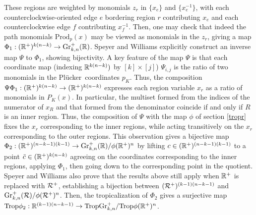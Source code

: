 \documentclass[12pt,letter]{article}
\newcommand{\gr}{\mathrm{Gr}}
\newcommand{\trop}{\mathrm{Trop}}
\newcommand{\prad}{\mathrm{Prod}}
\newcommand{\plu}{Pl\"ucker~}
\begin{document}
  These regions are weighted by monomials $z_r$ in $\{x_e\}$ and $\{x_e^{-1}\}$, with each counterclockwise-oriented edge $e$ bordering region $r$ contributing $x_e$ and each counterclockwise edge $f$ contributing $x_f^{-1}$. Then, one may check that indeed the path monomials $\prad_p(x)$ may be viewed as monomials in the $z_r$, giving a map $\Phi_1:(\RR^+)^{k(n-k)}\to \gr_{k,n}^+(\RR)$.
  Speyer and Williams explicitly construct an inverse map $\Psi$ to $\Phi_1$, showing bijectivity. 
  A key feature of the map $\Psi$ is that each coordinate map (indexing ${\mathbb R}^{k(n-k)})$ by $[k]\times [j]$) $\Psi_{i,j}$ is the ratio of two monomials in the \plu coordinates $p_{K}$. Thus, the composition $\Psi\Phi_1:({\mathbb R}^+)^{k(n-k)}\to({\mathbb R}^+)^{k(n-k)}$ expresses each region variable $x_r$ as a ratio of monomials in $P_K(x)$. In particular, the multiset formed from the indices of the numerator of $x_R$ and that formed from the denominator coincide if and only if $R$ is an inner region. Thus, the composition of $\Psi$ with the map $\phi$ of section \ref{tropr} fixes the $x_r$ corresponding to the inner regions, while acting transitively on the $x_r$ corresponding to the outer regions. This observation gives a bijective map $\Phi_2:(\RR^+)^{(n-k-1)(k-1)}\to\gr^+_{k,n}(\RR) /\phi(\RR^+)^n$ by lifting $c\in ({\mathbb R}^+)^{(n-k-1)(k-1)}$ to a point $\tilde{c}\in ({\mathbb R}^+)^{k(n-k)}$ agreeing on the coordinates corresponding to the inner regions, applying $\Phi_1$, then going down to the corresponding point in the quotient. Speyer and Williams also prove that the results above still apply when ${\mathbb R}^+$ is replaced with ${\mathcal R}^+$, establishing a bijection between $({\mathcal R}^+)^{(k-1)(n-k-1)}$ and $\gr_{k,n}^+(\Rcal)/\phi(\Rcal^+)^n$. Then, the tropicalization of $\Phi_2$ gives a surjective map $\trop\phi_2:\RR^{(k-1)(n-k-1)}\to \trop\gr_{k,n}^+/\trop\phi(\RR^+)^n$.
  
\end{document}
